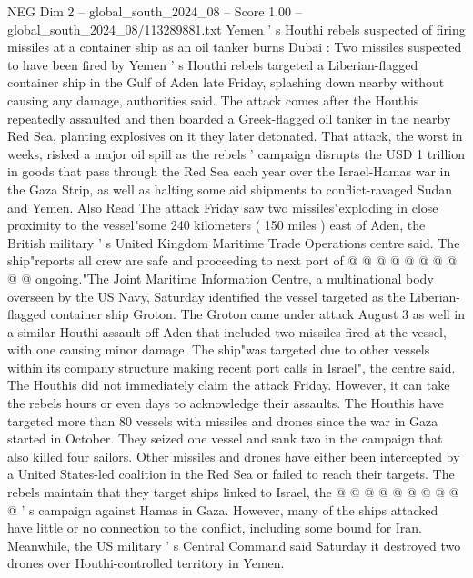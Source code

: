 \begin{textsample}{NEG Dim 2 – global\_south\_2024\_08 – Score 1.00 – global\_south\_2024\_08/113289881.txt}  \label{ex:f2_neg_110}
Yemen ' s Houthi rebels suspected of firing missiles at a container ship as an oil tanker burns Dubai : Two missiles suspected to have been fired by Yemen ' s Houthi rebels targeted a Liberian-flagged container ship in the Gulf of Aden late Friday, splashing down nearby without causing any damage, authorities said.
The attack comes after the Houthis repeatedly assaulted and then boarded a Greek-flagged oil tanker in the nearby Red Sea, planting explosives on it they later detonated.
That attack, the worst in weeks, risked a major oil spill as the rebels ' campaign disrupts the USD 1 trillion in goods that pass through the Red Sea each year over the Israel-Hamas war in the Gaza Strip, as well as halting some aid shipments to conflict-ravaged Sudan and Yemen.
Also Read The attack Friday saw two missiles"exploding in close proximity to the vessel"some 240 kilometers ( 150 miles ) east of Aden, the British military ' s United Kingdom Maritime Trade Operations centre said.
The ship"reports all crew are safe and proceeding to next port of @ @ @ @ @ @ @ @ @ @ ongoing."The Joint Maritime Information Centre, a multinational body overseen by the US Navy, Saturday identified the vessel targeted as the Liberian-flagged container ship Groton.
The Groton came under attack August 3 as well in a similar Houthi assault off Aden that included two missiles fired at the vessel, with one causing minor damage.
The ship"was targeted due to other vessels within its company structure making recent port calls in Israel", the centre said.
The Houthis did not immediately claim the attack Friday.
However, it can take the rebels hours or even days to acknowledge their assaults.
The Houthis have targeted more than 80 vessels with missiles and drones since the war in Gaza started in October.
They seized one vessel and sank two in the campaign that also killed four sailors.
Other missiles and drones have either been intercepted by a United States-led coalition in the Red Sea or failed to reach their targets.
The rebels maintain that they target ships linked to Israel, the @ @ @ @ @ @ @ @ @ @ ' s campaign against Hamas in Gaza.
However, many of the ships attacked have little or no connection to the conflict, including some bound for Iran.
Meanwhile, the US military ' s Central Command said Saturday it destroyed two drones over Houthi-controlled territory in Yemen.

\end{textsample}

